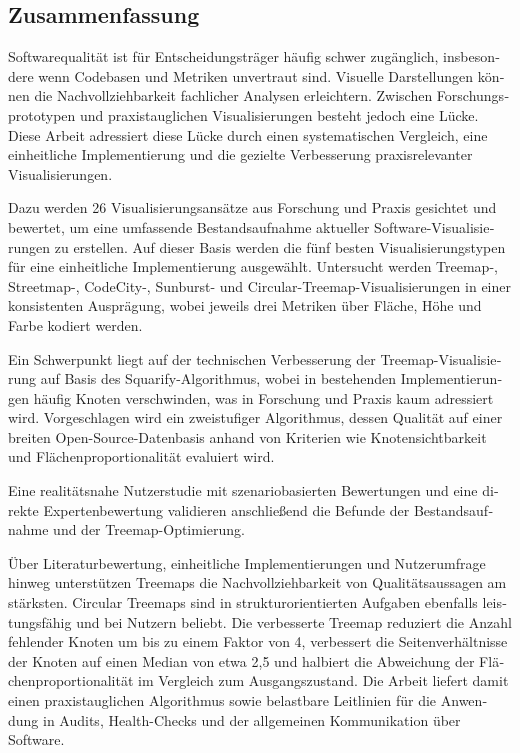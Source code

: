 \begin{otherlanguage}{ngerman}
	\chapter*{Zusammenfassung}
	
Softwarequalität ist für Entscheidungsträger häufig schwer zugänglich, insbesondere wenn Codebasen und Metriken unvertraut sind. Visuelle Darstellungen können die Nachvollziehbarkeit fachlicher Analysen erleichtern. Zwischen Forschungsprototypen und praxistauglichen Visualisierungen besteht jedoch eine Lücke. Diese Arbeit adressiert diese Lücke durch einen systematischen Vergleich, eine einheitliche Implementierung und die gezielte Verbesserung praxisrelevanter Visualisierungen.

Dazu werden 26 Visualisierungsansätze aus Forschung und Praxis gesichtet und bewertet, um eine umfassende Bestandsaufnahme aktueller Software-Visualisierungen zu erstellen. Auf dieser Basis werden die fünf besten Visualisierungstypen für eine einheitliche Implementierung ausgewählt. Untersucht werden Treemap-, Streetmap-, CodeCity-, Sunburst- und Circular-Treemap-Visualisierungen in einer konsistenten Ausprägung, wobei jeweils drei Metriken über Fläche, Höhe und Farbe kodiert werden.

Ein Schwerpunkt liegt auf der technischen Verbesserung der Treemap-Visualisierung auf Basis des Squarify-Algorithmus, wobei in bestehenden Implementierungen häufig Knoten verschwinden, was in Forschung und Praxis kaum adressiert wird. Vorgeschlagen wird ein zweistufiger Algorithmus, dessen Qualität auf einer breiten Open-Source-Datenbasis anhand von Kriterien wie Knotensichtbarkeit und Flächenproportionalität evaluiert wird.

Eine realitätsnahe Nutzerstudie mit szenariobasierten Bewertungen und eine direkte Expertenbewertung validieren anschließend die Befunde der Bestandsaufnahme und der Treemap-Optimierung.

Über Literaturbewertung, einheitliche Implementierungen und Nutzerumfrage hinweg unterstützen Treemaps die Nachvollziehbarkeit von Qualitätsaussagen am stärksten. Circular Treemaps sind in strukturorientierten Aufgaben ebenfalls leistungsfähig und bei Nutzern beliebt. Die verbesserte Treemap reduziert die Anzahl fehlender Knoten um bis zu einem Faktor von 4, verbessert die Seitenverhältnisse der Knoten auf einen Median von etwa 2{,}5 und halbiert die Abweichung der Flächenproportionalität im Vergleich zum Ausgangszustand. Die Arbeit liefert damit einen praxistauglichen Algorithmus sowie belastbare Leitlinien für die Anwendung in Audits, Health-Checks und der allgemeinen Kommunikation über Software.


\end{otherlanguage}
